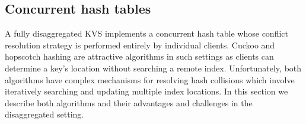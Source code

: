 \subsection{Concurrent hash tables} 
\label{sec:cuckoo-back}

A fully disaggregated KVS implements a concurrent hash table whose
conflict resolution strategy is performed entirely by individual
clients.
Cuckoo and hopscotch hashing are attractive algorithms in such
settings as clients can determine a key's location without searching a
remote index. Unfortunately, both algorithms have complex mechanisms
for resolving hash collisions which involve iteratively searching and
updating multiple index locations. In this section we describe both
algorithms and their advantages and challenges in the disaggregated
setting.





